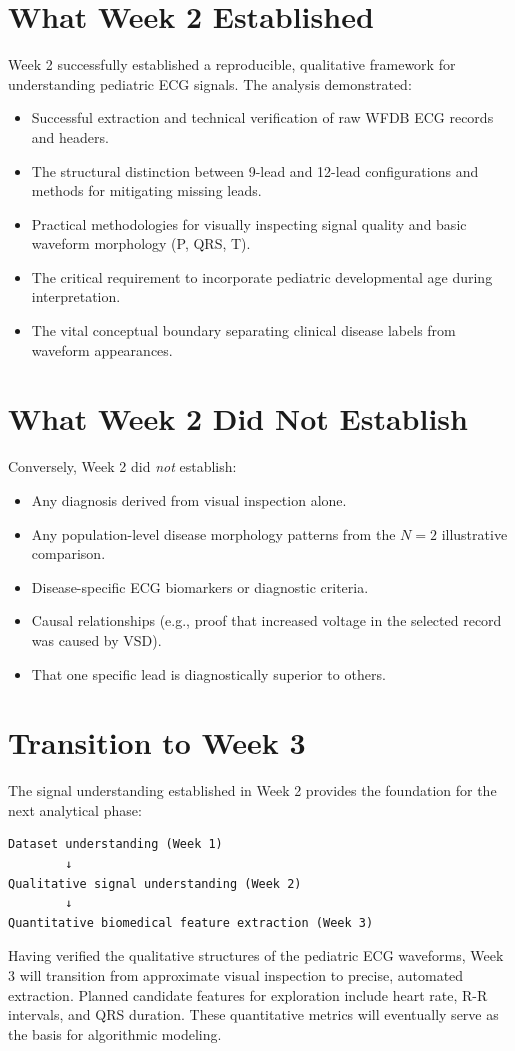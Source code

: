 \documentclass[11pt, a4paper]{article}
\begin{document}
\section{What Week 2 Established}
Week 2 successfully established a reproducible, qualitative framework for understanding pediatric ECG signals. The analysis demonstrated:
\begin{itemize}
    \item Successful extraction and technical verification of raw WFDB ECG records and headers.
    \item The structural distinction between 9-lead and 12-lead configurations and methods for mitigating missing leads.
    \item Practical methodologies for visually inspecting signal quality and basic waveform morphology (P, QRS, T).
    \item The critical requirement to incorporate pediatric developmental age during interpretation.
    \item The vital conceptual boundary separating clinical disease labels from waveform appearances.
\end{itemize}

\section{What Week 2 Did Not Establish}
Conversely, Week 2 did \textit{not} establish:
\begin{itemize}
    \item Any diagnosis derived from visual inspection alone.
    \item Any population-level disease morphology patterns from the $N=2$ illustrative comparison.
    \item Disease-specific ECG biomarkers or diagnostic criteria.
    \item Causal relationships (e.g., proof that increased voltage in the selected record was caused by VSD).
    \item That one specific lead is diagnostically superior to others.
\end{itemize}

\section{Transition to Week 3}
The signal understanding established in Week 2 provides the foundation for the next analytical phase:
\begin{verbatim}
Dataset understanding (Week 1)
        ↓
Qualitative signal understanding (Week 2)
        ↓
Quantitative biomedical feature extraction (Week 3)
\end{verbatim}
Having verified the qualitative structures of the pediatric ECG waveforms, Week 3 will transition from approximate visual inspection to precise, automated extraction. Planned candidate features for exploration include heart rate, R-R intervals, and QRS duration. These quantitative metrics will eventually serve as the basis for algorithmic modeling.
\end{document}
